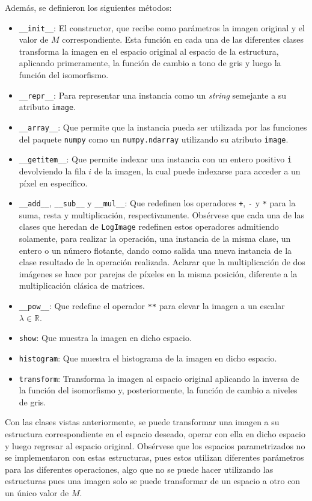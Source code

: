 Adem\'as, se definieron los siguientes m\'etodos:

\begin{itemize}
	\item \verb|__init__|: El constructor, que recibe como par\'ametros la imagen original y el valor de $M$ correspondiente. Esta funci\'on en cada una de las diferentes clases transforma la imagen en el espacio original al espacio de la estructura, aplicando primeramente, la funci\'on de cambio a tono de gris y luego la funci\'on del isomorfismo.
	\item \verb|__repr__|: Para representar una instancia como un \textit{string} semejante a su atributo \verb|image|.
	\item \verb|__array__|: Que permite que la instancia pueda ser utilizada por las funciones del paquete \verb|numpy| como un \verb|numpy.ndarray|  utilizando su atributo \verb|image|.
	\item \verb|__getitem__|: Que permite indexar una instancia con un entero positivo \verb|i| devolviendo la fila $i$ de la imagen, la cual puede indexarse para acceder a un p\'ixel en espec\'ifico.
	\item \verb|__add__|, \verb|__sub__| y \verb|__mul__|: Que redefinen los operadores \verb|+|, \verb|-| y \verb|*| para la suma, resta y multiplicaci\'on, respectivamente. Obs\'ervese que cada una de las clases que heredan de \verb|LogImage| redefinen estos operadores admitiendo solamente, para realizar la operaci\'on, una instancia de la misma clase, un entero o un n\'umero flotante, dando como salida una nueva instancia de la clase resultado de la operaci\'on realizada. Aclarar que la multiplicaci\'on de dos im\'agenes se hace por parejas de p\'ixeles en la misma posici\'on, diferente a la multiplicaci\'on cl\'asica de matrices.
	\item \verb|__pow__|: Que redefine el operador \verb|**| para elevar la imagen a un escalar $\lambda\in \mathbb{R}$.
	\item \verb|show|: Que muestra la imagen en dicho espacio.
	\item \verb|histogram|: Que muestra el histograma de la imagen en dicho espacio.
	\item \verb|transform|: Transforma la imagen al espacio original aplicando la inversa de la funci\'on del isomorfismo y, posteriormente, la funci\'on de cambio a niveles de gris.
\end{itemize}

Con las clases vistas anteriormente, se puede transformar una imagen a su estructura correspondiente en el espacio deseado, operar con ella en dicho espacio y luego regresar al espacio original. Obs\'ervese que los espacios parametrizados no se implementaron con estas estructuras, pues estos utilizan diferentes par\'ametros para las diferentes operaciones, algo que no se puede hacer utilizando las estructuras pues una imagen solo se puede transformar de un espacio a otro con un \'unico valor de $M$.

